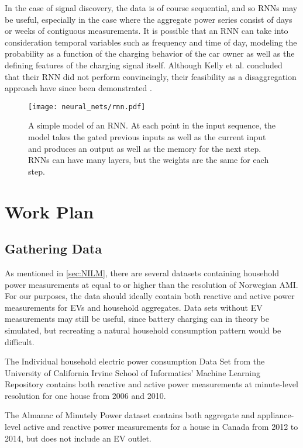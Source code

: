 \documentclass[12pt, american]{article}
\begin{document}
In the case of signal discovery, the data is of course sequential, and so RNNs may be useful, especially in the case where the aggregate power series consist of days or weeks of contiguous measurements. It is possible that an RNN can take into consideration temporal variables such as frequency and time of day, modeling the probability as a function of the charging behavior of the car owner as well as the defining features of the charging signal itself. Although Kelly et al. \cite{Kelly2015c} concluded that their RNN did not perform convincingly, their feasibility as a disaggregation approach have since been demonstrated \cite{Mauch2016}.

\begin{figure}[h]
\centering
\caption{A simple model of an RNN. At each point in the input sequence, the model takes the gated previous inputs as well as the current input and produces an output as well as the memory for the next step. RNNs can have many layers, but the weights are the same for each step.}
\texttt{[image: neural\_nets/rnn.pdf]}
\label{fig:rnn}
\end{figure}

\section{Work Plan}
\subsection{Gathering Data}
As mentioned in \autoref{sec:NILM}, there are several datasets containing household power measurements at equal to or higher than the resolution of Norwegian AMI. For our purposes, the data should ideally contain both reactive and active power measurements for EVs and household aggregates. Data sets without EV measurements may still be useful, since battery charging can in theory be simulated, but recreating a natural household consumption pattern would be difficult.

The Individual household electric power consumption Data Set from the University of California Irvine School of Informatics' Machine Learning Repository\cite{Dheeru2017} contains both reactive and active power measurements at minute-level resolution for one house from 2006 and 2010. 

The Almanac of Minutely Power dataset\cite{Makonin2016} contains both aggregate and appliance-level active and reactive power measurements for a house in Canada from 2012 to 2014, but does not include an EV outlet.
\end{document}
